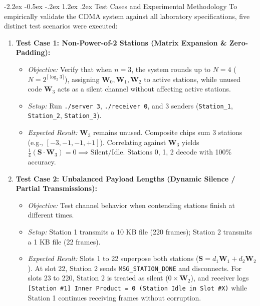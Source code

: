 \documentclass[11pt,a4paper]{article}
\makeatletter
\renewcommand\section{\@startsection {section}{1}{\z@}%
                                   {-2.2ex \@plus -0.5ex \@minus -.2ex}%
                                   {1.2ex \@plus.2ex}%
                                   {\normalfont\Large\bfseries}}
\makeatother
\begin{document}
\section{Test Cases and Experimental Methodology}
To empirically validate the CDMA system against all laboratory specifications, five distinct test scenarios were executed:
\begin{enumerate}
    \item \textbf{Test Case 1: Non-Power-of-2 Stations (Matrix Expansion \& Zero-Padding):}
    \begin{itemize}
        \item \textit{Objective:} Verify that when $n = 3$, the system rounds up to $N = 4$ ($N = 2^{\lceil \log_2 3 \rceil}$), assigning $\mathbf{W}_0, \mathbf{W}_1, \mathbf{W}_2$ to active stations, while unused code $\mathbf{W}_3$ acts as a silent channel without affecting active stations.
        \item \textit{Setup:} Run \texttt{./server 3}, \texttt{./receiver 0}, and 3 senders (\texttt{Station\_1}, \texttt{Station\_2}, \texttt{Station\_3}).
        \item \textit{Expected Result:} $\mathbf{W}_3$ remains unused. Composite chips sum 3 stations (e.g., $[-3, -1, -1, +1]$). Correlating against $\mathbf{W}_3$ yields $\frac{1}{4}(\mathbf{S} \cdot \mathbf{W}_3) = 0 \implies \text{Silent/Idle}$. Stations 0, 1, 2 decode with 100\% accuracy.
    \end{itemize}

    \item \textbf{Test Case 2: Unbalanced Payload Lengths (Dynamic Silence / Partial Transmissions):}
    \begin{itemize}
        \item \textit{Objective:} Test channel behavior when contending stations finish at different times.
        \item \textit{Setup:} Station 1 transmits a 10 KB file (220 frames); Station 2 transmits a 1 KB file (22 frames).
        \item \textit{Expected Result:} Slots 1 to 22 superpose both stations ($\mathbf{S} = d_1 \mathbf{W}_1 + d_2 \mathbf{W}_2$). At slot 22, Station 2 sends \texttt{MSG\_STATION\_DONE} and disconnects. For slots 23 to 220, Station 2 is treated as silent ($0 \times \mathbf{W}_2$), and receiver logs \texttt{[Station \#1] Inner Product = 0 (Station Idle in Slot \#X)} while Station 1 continues receiving frames without corruption.
    \end{itemize}


\end{enumerate}
\end{document}
